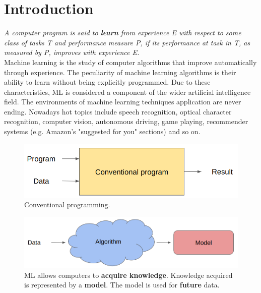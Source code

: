 \chapter{Introduction}
\label{cha:intro}

\textit{A computer program is said to \textbf{learn} from experience E with respect to some class of tasks T and performance measure P, if its performance at task in T, as measured by P, improves with experience E.}\\

Machine learning is the study of computer algorithms that improve automatically through experience. The peculiarity of machine learning algorithms is their ability to learn without being explicitly programmed. Due to these characteristics, ML is considered a component of the wider artificial intelligence field.
The environments of machine learning techniques application are never ending. Nowadays hot topics include speech recognition, optical character recognition, computer vision, autonomous driving, game playing, recommender systems (e.g. Amazon's "suggested for you" sections) and so on.

\begin{figure}
    \centering
    \includegraphics[width=\textwidth]{images/conventionalProgram.png}
    \caption{Conventional programming.}
    \label{fig:conventionalProgramming}
\end{figure}

\begin{figure}
    \centering
    \includegraphics[width=\textwidth]{images/MachineLearningvsConventional.png}
    \caption{ML allows computers to \textbf{acquire knowledge}. Knowledge acquired is represented by a \textbf{model}. The model is used for \textbf{future} data.}
    \label{fig:mlvsconventionalProgramming}
\end{figure}

